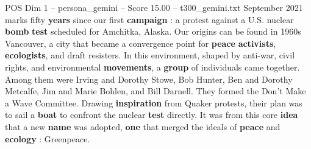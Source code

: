 \begin{textsample}{POS Dim 1 – persona\_gemini – Score 15.00 – t300\_gemini.txt}  \label{ex:f1_pos_042}
September 2021 marks fifty \textbf{years} since our first \textbf{campaign} : a protest against a U.S. nuclear \textbf{bomb} \textbf{test} scheduled for Amchitka, Alaska.
Our origins can be found in 1960s Vancouver, a city that became a convergence point for \textbf{peace} \textbf{activists}, \textbf{ecologists}, and draft resisters.
In this environment, shaped by anti-war, civil rights, and environmental \textbf{movements}, a \textbf{group} of individuals came together.
Among them were Irving and Dorothy Stowe, Bob Hunter, Ben and Dorothy Metcalfe, Jim and Marie Bohlen, and Bill Darnell.
They formed the Don't Make a Wave Committee.
Drawing \textbf{inspiration} from Quaker protests, their plan was to sail a \textbf{boat} to confront the nuclear \textbf{test} directly.
It was from this core \textbf{idea} that a new \textbf{name} was adopted, \textbf{one} that merged the ideals of \textbf{peace} and \textbf{ecology} : Greenpeace.

\end{textsample}
